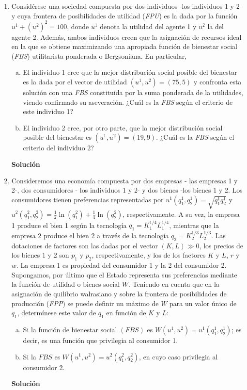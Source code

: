 \documentclass[10pt,a4paper]{article}
\begin{document}
\begin{enumerate}
	\item Considérese una sociedad compuesta por dos individuos -los individuos 1 y 2-  y cuya frontera de posibilidades de utilidad (\emph{FPU}) es la dada por la función $u^1+(u^2)^2 = 100$, donde $u^1$ denota la utilidad del agente 1 y $u^2$ la del agente 2. Además, ambos individuos creen que la asignación de recursos ideal en la que se obtiene maximizando una apropiada función de bienestar social (\emph{FBS}) utilitarista ponderada o Bergsoniana. En particular,
		\begin{enumerate}[a)]
			\item El individuo 1 cree que la mejor distribución social posible del bienestar es la dada por el vector de utilidad $\left( u^1, u^2\right) =(75, 5)$ y confronta esta solución con una \emph{FBS} constituida por la suma ponderada de la utilidades, viendo confirmado su aseveración. ¿Cuál es la \emph{FBS} según el criterio de este individuo 1?
			\item El individuo 2 cree, por otro parte, que la mejor distribución social posible del bienestar es $\left( u^1, u^2\right) =(19, 9)$. ¿Cuál es la \emph{FBS} según el criterio del individuo 2?
		\end{enumerate}
			\textbf{\LARGE Solución}\\
				
	\item Consideremos una economía compuesta por dos empresas - las empresas 1 y 2-, dos consumidores - los individuos 1 y 2- y dos bienes -los bienes 1 y 2. Los consumidores tienen preferencias representadas por $u^1\left( q_{1}^{1},q_{2}^{1}\right) = \sqrt{q_{1}^{1}q_{2}^{1}}$ y $u^2\left( q_{1}^{2},q_{2}^{2}\right) = \frac{1}{2}\ln(q_{1}^{2})+\frac{1}{4}\ln(q_{2}^{2})$, respectivamente. A su vez, la empresa 1 produce el bien 1 según la tecnología $q_1=K_{1}^{1/4}L_{1}^{1/4}$, mientras que la empresa 2 produce el bien 2 a través de la tecnología $q_2=K_{2}^{1/3}L_{2}^{1/3}$. Las dotaciones de factores son las dadas por el vector $(K, L)\gg 0$, los precios de los bienes 1 y 2 son $p_1$ y $p_2$, respectivamente, y los de los factores $K$ y $L$, $r$ y $w$. La empresa 1 es propiedad del consumidor 1 y la 2 del consumidor 2. Supongamos, por último que el Estado representa sus preferencias mediante la función de utilidad o bienes social $W$. Teniendo en cuenta que en la asignación de quilibrio walrasiano y sobre la frontera de posibilidades de producción (\emph{FPP}) se puede definir un máximo de $W$ para un valor único de $q_1$, determínese este valor de $q_1$ en función de $K$ y $L$:
		\begin{enumerate}[a)]
			\item Si la función de bienestar social $(FBS)$ es $W\left( u^1,u^2\right) = u^1\left( q_{1}^{1},q_{2}^{1}\right)$; es decir, es una función que privilegia al consumidor 1.
			\item Si la $FBS$ es $W\left( u^1,u^2\right) = u^2\left( q_{1}^{2},q_{2}^{2}\right)$, en cuyo caso privilegia al consumidor 2.
		\end{enumerate}
			\textbf{\LARGE Solución}\\
				
\end{enumerate}
\end{document}

